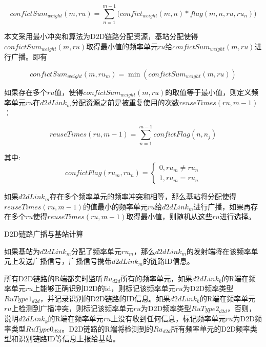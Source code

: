 \documentclass[figurelist,tablelist,algorithmlist,nomlist,masters]{seuthesix}
\begin{document}
\begin{enumerate}
		\begin{equation}\label{eq2.1}
		confictSu{m_{weight}}(m,ru) = \sum\limits_{n = 1}^{m - 1} {(confic{t_{weight}}(m,n)} *flag(m,n,ru,r{u_n}))
		\end{equation}
		
		本文采用最小冲突和算法为D2D链路分配资源，基站分配使得$confictSu{m_{weight}}(m,ru)$取得最小值的频率单元$ru$给$confictSu{m_{weight}}(m,ru)$进行广播。即有
		
		\begin{equation}\label{eq2.1}
		confictSu{m_{weight}}(m,r{u_m}) = \min (confictSu{m_{weight}}(m,ru))
		\end{equation}
		
		如果存在多个$ru$值，使得$confictSu{m_{weight}}(m,ru)$的取值等于最小值，则定义频率单元$ru$在$d2dLin{k_m}$分配资源之前是被重复使用的次数$reuseTimes(ru,m - 1)$：
		
		\begin{equation}\label{eq2.1}
		reuseTimes(ru,m - 1) = \sum\limits_{n = 1}^{m - 1} {confictFlag(n,{n_j})}
		\end{equation}
		
		其中:
		\begin{equation}\label{eq2.1}
		confictFlag(r{u_m},r{u_n}) = \left\{ \begin{array}{l}
		0,r{u_m} \ne r{u_n}\\
		1,r{u_m} = r{u_n}
		\end{array} \right.
		\end{equation}
		
		如果$d2dLin{k_m}$存在多个频率单元的频率冲突和相等，那么基站将分配使得$reuseTimes(ru,m - 1)$的值最小的频率单元$ru$给$d2dLin{k_m}$进行广播，如果再存在多个$ru$使得$reuseTimes(ru,m - 1)$取得最小值，则随机从这些$ru$进行选择。
		
		
		D2D链路广播与基站计算
		
		
		如果基站为$d2dLin{k_m}$分配了频率单元$r{u_m}$，那么$d2dLin{k_m}$的发射端将在该频率单元上发送广播信号，广播信号携带$d2dLin{k_m}$的链路ID信息。
		
		所有D2D链路的R端都实时监听$R{u_{d2d}}$所有的频率单元，如果$d2dLin{k_k}$的R端在频率单元$ru$上能够正确识别D2D的id，则标记该频率单元$ru$为D2D频率类型$RuType{1_{d2d}}$，并记录识别的D2D链路的ID信息。如果$d2dLin{k_k}$的R端在频率单元$ru$上检测到广播冲突，则标记该频率单元$ru$为D2D频率类型$RuType{2_{d2d}}$，否则，说明$d2dLin{k_k}$的R端在频率单元$ru$上没有收到任何信息，标记频率单元$ru$为D2D频率类型$RuType{0_{d2d}}$。D2D链路的R端将检测到的$R{u_{d2d}}$所有频率单元的D2D频率类型和识别链路ID等信息上报给基站。
		

\end{enumerate}
\end{document}
